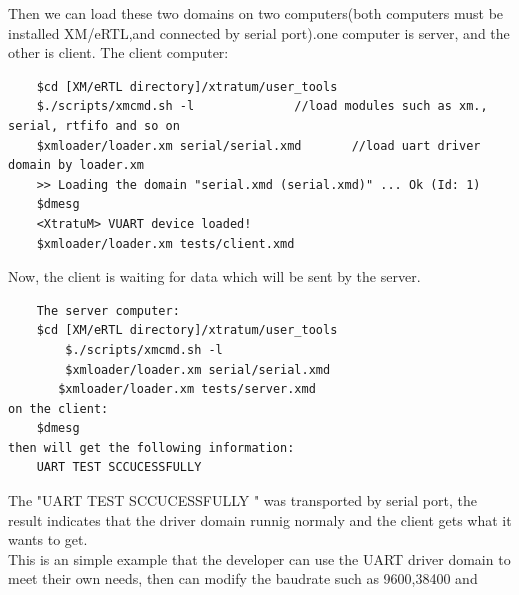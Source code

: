 	Then we can load these two domains on two computers(both computers must be installed XM/eRTL,and connected by serial port).one computer is server, and the other is client.
		The client computer:
\begin{verbatim}
	$cd [XM/eRTL directory]/xtratum/user_tools
	$./scripts/xmcmd.sh -l   			//load modules such as xm., serial, rtfifo and so on
	$xmloader/loader.xm serial/serial.xmd  		//load uart driver domain by loader.xm
	>> Loading the domain "serial.xmd (serial.xmd)" ... Ok (Id: 1)
	$dmesg
	<XtratuM> VUART device loaded!  			
	$xmloader/loader.xm tests/client.xmd   		
\end{verbatim}
Now, the client is waiting for data which will be sent by the server.
\begin{verbatim}	
	The server computer:
	$cd [XM/eRTL directory]/xtratum/user_tools
       	$./scripts/xmcmd.sh -l
        $xmloader/loader.xm serial/serial.xmd
       $xmloader/loader.xm tests/server.xmd
on the client:
	$dmesg
then will get the following information:
	UART TEST SCCUCESSFULLY
\end{verbatim}
	The "UART TEST SCCUCESSFULLY " was transported by serial port, the result indicates that the driver domain runnig normaly and the client gets what it wants to get.
\\
	This is an simple example that the developer can use the UART driver domain to meet their own needs, then can modify the baudrate such as 9600,38400 and

